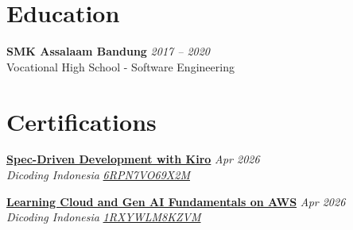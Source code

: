 \documentclass[11pt,a4paper]{article}
\begin{document}
\section*{Education}
\textbf{SMK Assalaam Bandung} \hfill \textit{2017 -- 2020} \\
Vocational High School - Software Engineering

\section*{Certifications}

\href{https://dicoding.com/certificates/6RPN7VO69X2M}{\textbf{Spec-Driven Development with Kiro}} \hfill \textit{Apr 2026} \\
\textit{Dicoding Indonesia} \hfill \href{https://dicoding.com/certificates/6RPN7VO69X2M}{\textit{6RPN7VO69X2M}}

\vspace{6pt}

\href{https://dicoding.com/certificates/1RXYWLM8KZVM}{\textbf{Learning Cloud and Gen AI Fundamentals on AWS}} \hfill \textit{Apr 2026} \\
\textit{Dicoding Indonesia} \hfill \href{https://dicoding.com/certificates/1RXYWLM8KZVM}{\textit{1RXYWLM8KZVM}}
\end{document}
